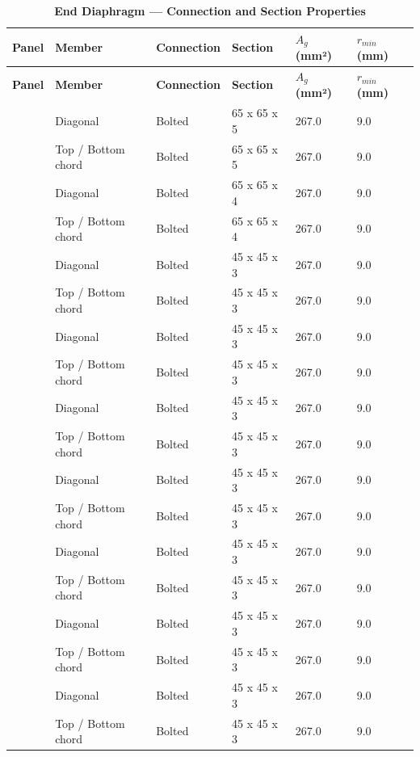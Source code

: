 \documentclass[12pt,a4paper]{report}
\numberwithin{table}{chapter}
\numberwithin{figure}{chapter}
\begin{document}
\begin{longtable}{|C{2.0cm}|L{2.0cm}|L{2.2cm}|C{2.5cm}|C{2.0cm}|C{2.0cm}|}
\caption{\textbf{End Diaphragm --- Connection and Section Properties}}
\hline
\textbf{Panel} & \textbf{Member} & \textbf{Connection} & \textbf{Section} & \textbf{$A_g$ (mm²)} & \textbf{$r_{min}$ (mm)} \\[6pt]
\hline
\endfirsthead
\hline
\textbf{Panel} & \textbf{Member} & \textbf{Connection} & \textbf{Section} & \textbf{$A_g$ (mm²)} & \textbf{$r_{min}$ (mm)} \\[6pt]
\hline
\endhead
{} & Diagonal & Bolted & 65 x 65 x 5 & 267.0 & 9.0 \\[6pt]
 & Top / Bottom chord & Bolted & 65 x 65 x 5 & 267.0 & 9.0 \\[6pt]
\hline
{} & Diagonal & Bolted & 65 x 65 x 4 & 267.0 & 9.0 \\[6pt]
 & Top / Bottom chord & Bolted & 65 x 65 x 4 & 267.0 & 9.0 \\[6pt]
\hline
{} & Diagonal & Bolted & 45 x 45 x 3 & 267.0 & 9.0 \\[6pt]
 & Top / Bottom chord & Bolted & 45 x 45 x 3 & 267.0 & 9.0 \\[6pt]
\hline
{} & Diagonal & Bolted & 45 x 45 x 3 & 267.0 & 9.0 \\[6pt]
 & Top / Bottom chord & Bolted & 45 x 45 x 3 & 267.0 & 9.0 \\[6pt]
\hline
{} & Diagonal & Bolted & 45 x 45 x 3 & 267.0 & 9.0 \\[6pt]
 & Top / Bottom chord & Bolted & 45 x 45 x 3 & 267.0 & 9.0 \\[6pt]
\hline
{} & Diagonal & Bolted & 45 x 45 x 3 & 267.0 & 9.0 \\[6pt]
 & Top / Bottom chord & Bolted & 45 x 45 x 3 & 267.0 & 9.0 \\[6pt]
\hline
{} & Diagonal & Bolted & 45 x 45 x 3 & 267.0 & 9.0 \\[6pt]
 & Top / Bottom chord & Bolted & 45 x 45 x 3 & 267.0 & 9.0 \\[6pt]
\hline
{} & Diagonal & Bolted & 45 x 45 x 3 & 267.0 & 9.0 \\[6pt]
 & Top / Bottom chord & Bolted & 45 x 45 x 3 & 267.0 & 9.0 \\[6pt]
\hline
{} & Diagonal & Bolted & 45 x 45 x 3 & 267.0 & 9.0 \\[6pt]
 & Top / Bottom chord & Bolted & 45 x 45 x 3 & 267.0 & 9.0 \\[6pt]
\hline
\end{longtable}
\end{document}
